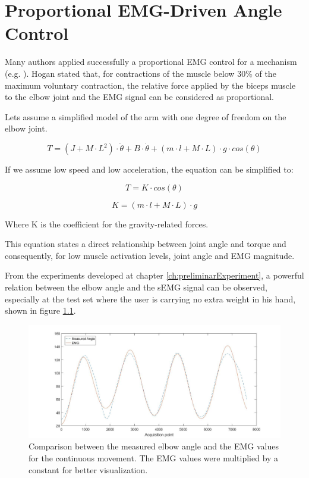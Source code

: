 \chapter{Proportional EMG-Driven Angle Control}
\label{ch:ProportionalControl}

Many authors applied successfully a proportional EMG control for a mechanism (e.g. \cite{Bottomley411}). Hogan \cite{1103644} stated that, for contractions of the muscle below 30\% of the maximum voluntary contraction, the relative force applied by the biceps muscle to the elbow joint and the EMG signal can be considered as proportional. 

Lets assume a simplified model of the arm with one degree of freedom on the elbow joint. 

\begin{equation}\label{eq:simpleModel}
T = (J + M\cdot L^2)\cdot \ddot{\theta}  + B \cdot \dot{\theta}  + (m\cdot l + M \cdot L) \cdot g \cdot cos(\theta)
\end{equation}


If we assume low speed and low acceleration, the equation can be simplified to:

\begin{equation}\label{eq:kcos}
T = K \cdot cos(\theta)
\end{equation}

\begin{equation}
K = (m\cdot l + M\cdot L)\cdot g
\end{equation}

Where K is the coefficient for the gravity-related forces.

This equation states a direct relationship between joint angle and torque and consequently, for low muscle activation levels, joint angle and EMG magnitude.

From the experiments developed at chapter \ref{ch:preliminarExperiment}, a powerful relation between the elbow angle and the sEMG signal can be observed, especially at the test set where the user is carrying no extra weight in his hand, shown in figure \ref{EmgAngleDirect}.

\begin{figure}[thpb]
      \centering
      \includegraphics[scale=0.35]{Images/EmgAngleDirect.jpg}
      \caption{Comparison between the measured elbow angle and the EMG values for the continuous movement. The EMG values were multiplied by a constant for better visualization.}
      \label{EmgAngleDirect}
   \end{figure}
   
